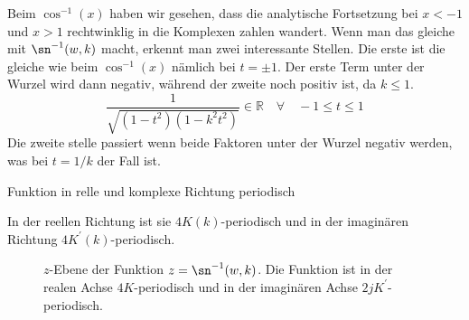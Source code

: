 Beim $\cos^{-1}(x)$ haben wir gesehen, dass die analytische Fortsetzung bei $x < -1$ und $x > 1$ rechtwinklig in die Komplexen zahlen wandert.
Wenn man das gleiche mit $\sn^{-1}(w, k)$ macht, erkennt man zwei interessante Stellen.
Die erste ist die gleiche wie beim $\cos^{-1}(x)$ nämlich bei $t = \pm 1$.
Der erste Term unter der Wurzel wird dann negativ, während der zweite noch positiv ist, da $k \leq 1$.
\begin{equation}
    \frac{
        1
    }{
        \sqrt{
            (1-t^2)(1-k^2 t^2)
        }
    }
    \in \mathbb{R}
    \quad \forall \quad
    -1 \leq t \leq 1
\end{equation}
Die zweite stelle passiert wenn beide Faktoren unter der Wurzel negativ werden, was bei $t = 1/k$ der Fall ist.




Funktion in relle und komplexe Richtung periodisch

In der reellen Richtung ist sie $4K(k)$-periodisch und in der imaginären Richtung $4K^\prime(k)$-periodisch.




\begin{figure}
    \centering
    
    \caption{
        $z$-Ebene der Funktion $z = \sn^{-1}(w, k)$.
        Die Funktion ist in der realen Achse $4K$-periodisch und in der imaginären Achse $2jK^\prime$-periodisch.
    }
\end{figure}
